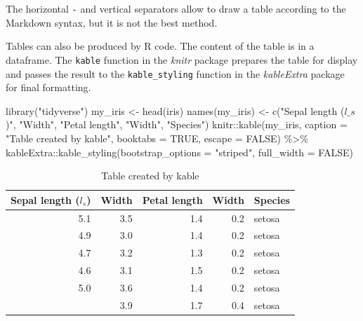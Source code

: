 \documentclass[
  12pt,
  american,
  a4paper,
  extrafontsizes,onecolumn,openright
  ]{memoir}
\newenvironment{Shaded}{\begin{snugshade}}{\end{snugshade}}
\newcommand{\AttributeTok}[1]{\textcolor[rgb]{0.77,0.63,0.00}{#1}}
\newcommand{\ConstantTok}[1]{\textcolor[rgb]{0.00,0.00,0.00}{#1}}
\newcommand{\FunctionTok}[1]{\textcolor[rgb]{0.00,0.00,0.00}{#1}}
\newcommand{\NormalTok}[1]{#1}
\newcommand{\OtherTok}[1]{\textcolor[rgb]{0.56,0.35,0.01}{#1}}
\newcommand{\SpecialCharTok}[1]{\textcolor[rgb]{0.00,0.00,0.00}{#1}}
\newcommand{\StringTok}[1]{\textcolor[rgb]{0.31,0.60,0.02}{#1}}
\begin{document}
The horizontal \texttt{-} and vertical \texttt{\textbar{}} separators allow to draw a table according to the Markdown syntax, but it is not the best method.

Tables can also be produced by R code.
The content of the table is in a dataframe.
The \texttt{kable} function in the \emph{knitr} package prepares the table for display and passes the result to the \texttt{kable\_styling} function in the \emph{kableExtra} package for final formatting.

\scriptsize

\begin{Shaded}
\begin{Highlighting}[]
\FunctionTok{library}\NormalTok{(}\StringTok{"tidyverse"}\NormalTok{)}
\NormalTok{my\_iris }\OtherTok{\textless{}{-}} \FunctionTok{head}\NormalTok{(iris)}
\FunctionTok{names}\NormalTok{(my\_iris) }\OtherTok{\textless{}{-}} \FunctionTok{c}\NormalTok{(}\StringTok{"Sepal length ($l\_s$)"}\NormalTok{, }\StringTok{"Width"}\NormalTok{, }\StringTok{"Petal length"}\NormalTok{,}
    \StringTok{"Width"}\NormalTok{, }\StringTok{"Species"}\NormalTok{)}
\NormalTok{knitr}\SpecialCharTok{::}\FunctionTok{kable}\NormalTok{(my\_iris, }\AttributeTok{caption =} \StringTok{"Table created by kable"}\NormalTok{, }\AttributeTok{booktabs =} \ConstantTok{TRUE}\NormalTok{,}
    \AttributeTok{escape =} \ConstantTok{FALSE}\NormalTok{) }\SpecialCharTok{\%\textgreater{}\%}
\NormalTok{    kableExtra}\SpecialCharTok{::}\FunctionTok{kable\_styling}\NormalTok{(}\AttributeTok{bootstrap\_options =} \StringTok{"striped"}\NormalTok{,}
        \AttributeTok{full\_width =} \ConstantTok{FALSE}\NormalTok{)}
\end{Highlighting}
\end{Shaded}

\begin{table}

\caption{\label{tab:kable}Table created by kable}
\centering
\begin{tabular}[t]{rrrrl}
\toprule
Sepal length ($l_s$) & Width & Petal length & Width & Species\\
\midrule
5.1 & 3.5 & 1.4 & 0.2 & setosa\\
4.9 & 3.0 & 1.4 & 0.2 & setosa\\
4.7 & 3.2 & 1.3 & 0.2 & setosa\\
4.6 & 3.1 & 1.5 & 0.2 & setosa\\
5.0 & 3.6 & 1.4 & 0.2 & setosa\\
\addlinespace
5.4 & 3.9 & 1.7 & 0.4 & setosa\\
\bottomrule
\end{tabular}
\end{table}
\end{document}
